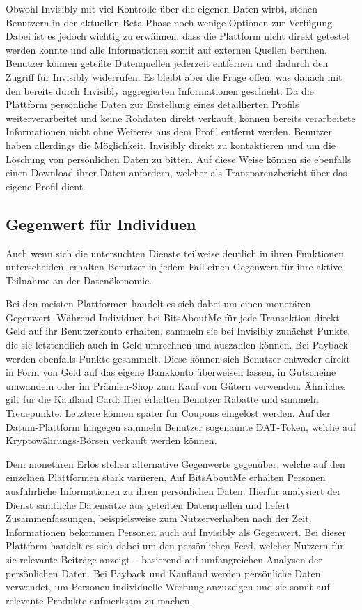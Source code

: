 \noindent Obwohl Invisibly mit viel Kontrolle über die eigenen Daten wirbt, stehen Benutzern in der aktuellen Beta-Phase noch wenige Optionen zur Verfügung. Dabei ist es jedoch wichtig zu erwähnen, dass die Plattform nicht direkt getestet werden konnte und alle Informationen somit auf externen Quellen beruhen. Benutzer können geteilte Datenquellen jederzeit entfernen und dadurch den Zugriff für Invisibly widerrufen. Es bleibt aber die Frage offen, was danach mit den bereits durch Invisibly aggregierten Informationen geschieht: Da die Plattform persönliche Daten zur Erstellung eines detaillierten Profils weiterverarbeitet und keine Rohdaten direkt verkauft, können bereits verarbeitete Informationen nicht ohne Weiteres aus dem Profil entfernt werden. Benutzer haben allerdings die Möglichkeit, Invisibly direkt zu kontaktieren und um die Löschung von persönlichen Daten zu bitten. Auf diese Weise können sie ebenfalls einen Download ihrer Daten anfordern, welcher als Transparenzbericht über das eigene Profil dient.

\subsection{Gegenwert für Individuen}
Auch wenn sich die untersuchten Dienste teilweise deutlich in ihren Funktionen unterscheiden, erhalten Benutzer in jedem Fall einen Gegenwert für ihre aktive Teilnahme an der Datenökonomie. \newline

\noindent Bei den meisten Plattformen handelt es sich dabei um einen monetären Gegenwert. Während Individuen bei BitsAboutMe für jede Transaktion direkt Geld auf ihr Benutzerkonto erhalten, sammeln sie bei Invisibly zunächst Punkte, die sie letztendlich auch in Geld umrechnen und auszahlen können. Bei Payback werden ebenfalls Punkte gesammelt. Diese können sich Benutzer entweder direkt in Form von Geld auf das eigene Bankkonto überweisen lassen, in Gutscheine umwandeln oder im Prämien-Shop zum Kauf von Gütern verwenden. Ähnliches gilt für die Kaufland Card: Hier erhalten Benutzer  Rabatte und sammeln Treuepunkte. Letztere können später für Coupons eingelöst werden. Auf der Datum-Plattform hingegen sammeln Benutzer sogenannte DAT-Token, welche auf Kryptowährungs-Börsen verkauft werden können.\newline

\noindent Dem monetären Erlös stehen alternative Gegenwerte gegenüber, welche auf den einzelnen Plattformen stark variieren. Auf BitsAboutMe erhalten Personen ausführliche Informationen zu ihren persönlichen Daten. Hierfür analysiert der Dienst sämtliche Datensätze aus geteilten Datenquellen und liefert Zusammenfassungen, beispielsweise zum Nutzerverhalten nach der Zeit. Informationen bekommen Personen auch auf Invisibly als Gegenwert. Bei dieser Plattform handelt es sich dabei um den persönlichen Feed, welcher Nutzern für sie relevante Beiträge anzeigt -- basierend auf umfangreichen Analysen der persönlichen Daten. Bei Payback und Kaufland werden persönliche Daten verwendet, um Personen individuelle Werbung anzuzeigen und sie somit auf relevante Produkte aufmerksam zu machen.

